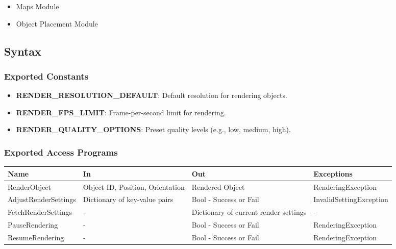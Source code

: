 \documentclass[12pt, titlepage]{article}
\begin{document}
\begin{itemize}
  \item Maps Module
  \item Object Placement Module
\end{itemize}

\subsection{Syntax}

\subsubsection{Exported Constants}

\begin{itemize}
  \item \textbf{RENDER\_RESOLUTION\_DEFAULT}: Default resolution for rendering objects.
  \item \textbf{RENDER\_FPS\_LIMIT}: Frame-per-second limit for rendering.
  \item \textbf{RENDER\_QUALITY\_OPTIONS}: Preset quality levels (e.g., low, medium, high).
\end{itemize}

\subsubsection{Exported Access Programs}

\begin{center}
  \begin{tabular}{p{4cm} p{4cm} p{4cm} p{4cm}}
    \hline
    \textbf{Name}        & \textbf{In}                      & \textbf{Out}                          & \textbf{Exceptions}     \\
    \hline
    RenderObject         & Object ID, Position, Orientation & Rendered Object                       & RenderingException      \\
    \hline
    AdjustRenderSettings & Dictionary of key-value pairs    & Bool - Success or Fail                & InvalidSettingException \\
    \hline
    FetchRenderSettings  & -                                & Dictionary of current render settings & -                       \\
    \hline
    PauseRendering       & -                                & Bool - Success or Fail                & RenderingException      \\
    \hline
    ResumeRendering      & -                                & Bool - Success or Fail                & RenderingException      \\
    \hline
  \end{tabular}
\end{center}
\end{document}
